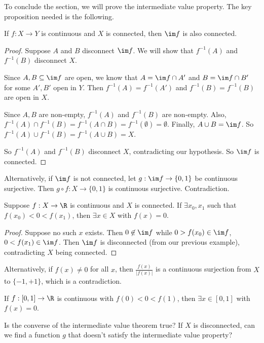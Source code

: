 \documentclass[a4paper]{article}
\begin{document}
To conclude the section, we will prove the intermediate value property. The key proposition needed is the following.
\begin{prop}
  If $f: X\to Y$ is continuous and $X$ is connected, then $\im f$ is also connected.
\end{prop}

\begin{proof}
  Suppose $A$ and $B$ disconnect $\im f$. We will show that $f^{-1}(A)$ and $f^{-1}(B)$ disconnect $X$.

  Since $A, B\subseteq \im f$ are open, we know that $A = \im f\cap A'$ and $B = \im f\cap B'$ for some $A', B'$ open in $Y$. Then $f^{-1}(A) = f^{-1}(A')$ and $f^{-1}(B) = f^{-1}(B)$ are open in $X$.

  Since $A, B$ are non-empty, $f^{-1}(A)$ and $f^{-1}(B)$ are non-empty. Also, $f^{-1}(A) \cap f^{-1}(B) = f^{-1}(A\cap B) = f^{-1}(\emptyset) = \emptyset$. Finally, $A\cup B = \im f$. So $f^{-1}(A)\cup f^{-1}(B) = f^{-1}(A\cup B) = X$.

  So $f^{-1}(A)$ and $f^{-1}(B)$ disconnect $X$, contradicting our hypothesis. So $\im f$ is connected.
\end{proof}
Alternatively, if $\im f$ is not connected, let $g: \im f \to \{0, 1\}$ be continuous surjective. Then $g\circ f: X \to \{0, 1\}$ is continuous surjective. Contradiction.

\begin{thm}
  Suppose $f: X\to \R$ is continuous and $X$ is connected. If $\exists x_0, x_1$ such that $f(x_0) < 0 < f(x_1)$, then $\exists x\in X$ with $f(x) = 0$.
\end{thm}

\begin{proof}
  Suppose no such $x$ exists. Then $0\not\in \im f$ while $0 > f(x_0) \in \im f$, $0 < f(x_1) \in \im f$. Then $\im f$ is disconnected (from our previous example), contradicting $X$ being connected.
\end{proof}
Alternatively, if $f(x) \not= 0$ for all $x$, then $\frac{f(x)}{|f(x)|}$ is a continuous surjection from $X$ to $\{-1, +1\}$, which is a contradiction.

\begin{cor}
  If $f: [0, 1] \to \R$ is continuous with $f(0) < 0 < f(1)$, then $\exists x\in [0, 1]$ with $f(x) = 0$.
\end{cor}
Is the converse of the intermediate value theorem true? If $X$ is disconnected, can we find a function $g$ that doesn't satisfy the intermediate value property?
\end{document}
